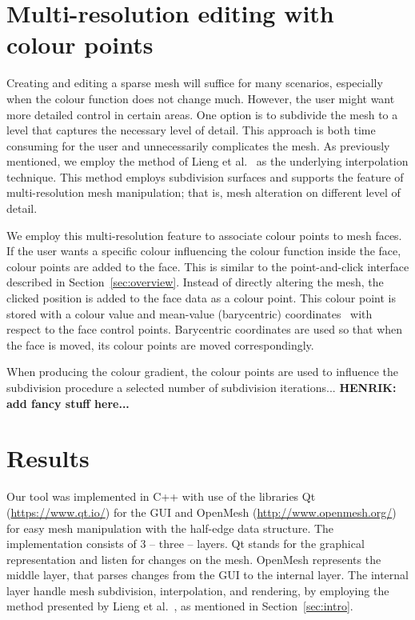 \documentclass{egpubl}
\newcommand{\note}[3]{{\color{#2}\textbf{#1: #3}}}
\newcommand{\henrik}[1]{\note{HENRIK}{WildStrawberry}{#1}}
\begin{document}
\section{Multi-resolution editing with colour points}
\label{sec:DP}

Creating and editing a sparse mesh will suffice for many scenarios, especially when the colour function does not change much. However, the user might want more detailed control in certain areas. One option is to subdivide the mesh to a level that captures the necessary level of detail. This approach is both time consuming for the user and unnecessarily complicates the mesh. As previously mentioned, we employ the method of Lieng et al.~\cite{Lieng:2016} as the underlying interpolation technique. This method employs subdivision surfaces and supports the feature of multi-resolution mesh manipulation; that is, mesh alteration on different level of detail. 

We employ this multi-resolution feature to associate colour points to mesh faces. If the user wants a specific colour influencing the colour function inside the face, colour points are added to the face. This is similar to the point-and-click interface described in Section~\ref{sec:overview}. Instead of directly altering the mesh, the clicked position is added to the face data as a colour point. This colour point is stored with a colour value and mean-value (barycentric) coordinates~\cite{Floater:2003} with respect to the face control points. Barycentric coordinates are used so that when the face is moved, its colour points are moved correspondingly.

When producing the colour gradient, the colour points are used to influence the subdivision procedure a selected number of subdivision iterations... \henrik{add fancy stuff here...}

\section{Results}
\label{sec:results}

Our tool was implemented in C++ with use of the libraries Qt (\url{https://www.qt.io/}) for the GUI and OpenMesh (\url{http://www.openmesh.org/}) for easy mesh manipulation with the half-edge data structure. The implementation consists of 3 -- three -- layers. Qt stands for the graphical representation and listen for changes on the mesh. OpenMesh represents the middle layer, that parses changes from the GUI to the internal layer. The internal layer handle mesh subdivision, interpolation, and rendering, by employing the method presented by Lieng et al.~\cite{Lieng:2016}, as mentioned in Section~\ref{sec:intro}.
\end{document}
